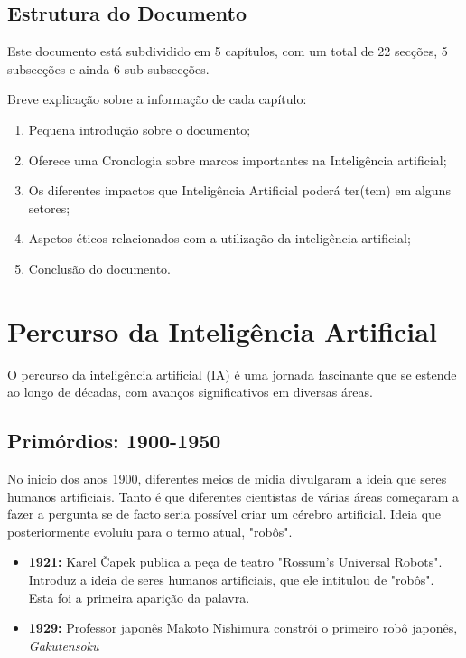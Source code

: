 \documentclass[a4paper, 11pt, onecolumn, oneside]{report}
\begin{document}
\section{Estrutura do Documento}
Este documento está subdividido em 5 capítulos, com um total de 22 secções, 5 subsecções e ainda 6 sub-subsecções. 
\par
Breve explicação sobre a informação de cada capítulo:
\begin{enumerate}
    \item Pequena introdução sobre o documento;
    \item Oferece uma Cronologia sobre marcos importantes na Inteligência artificial;
    \item Os diferentes impactos que Inteligência Artificial poderá ter(tem) em alguns setores;
    \item Aspetos éticos relacionados com a utilização da inteligência artificial;
    \item Conclusão do documento.
\end{enumerate}
%
%
\chapter{Percurso da Inteligência Artificial}
\label{chap.origens}
O percurso da inteligência artificial (IA) é uma jornada fascinante que se estende ao longo de décadas, com avanços significativos em diversas áreas. 

\section{Primórdios: 1900-1950}
No inicio dos anos 1900, diferentes meios de mídia divulgaram a ideia que seres humanos artificiais. Tanto é que diferentes cientistas de várias áreas começaram a fazer a pergunta se de facto seria possível criar um cérebro artificial. Ideia que posteriormente evoluiu para o termo atual, "robôs".
%
\begin{itemize}
    \item \textbf{1921:} Karel Čapek publica a peça de teatro "Rossum's Universal Robots"\cite{rossum_universal_robots}. Introduz a ideia de seres humanos artificiais, que ele intitulou de "robôs". Esta foi a primeira aparição da palavra.
    \item \textbf{1929:} Professor japonês Makoto Nishimura constrói o primeiro robô japonês, \textit{Gakutensoku}\cite{gakutensokus}
\end{itemize}
\end{document}

